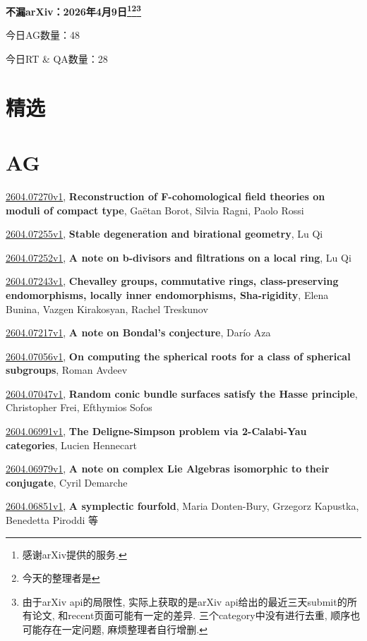 \documentclass[9pt, a4paper]{article}
\theoremstyle{plain}
\theoremstyle{definition}
\theoremstyle{remark}
\newcommand{\arxiv}[3]{\href{https://arxiv.org/abs/#1}{#1}, \textbf{\textcolor{arxivblue}{#2}}, #3}
\newcommand{\AGnumber}{48}
\newcommand{\RTQAnumber}{28}
\newcommand{\NewestDate}{2026年4月9日}
\newcommand{\todayarXiver}{} %
\begin{document}
\begin{center}
    \Huge\textbf{不漏arXiv：\NewestDate\footnote{感谢arXiv提供的服务.}\footnote{今天的整理者是\todayarXiver}\footnote{由于arXiv api的局限性, 实际上获取的是arXiv api给出的最近三天submit的所有论文, 和recent页面可能有一定的差异. 三个category中没有进行去重, 顺序也可能存在一定问题, 麻烦整理者自行增删.}} \\
\end{center}

\setcounter{section}{-1}

\begin{center}
    今日AG数量：\AGnumber
    
    今日RT \& QA数量：\RTQAnumber
    
\end{center}


\section{精选}


\section{AG}
\arxiv{2604.07270v1}{Reconstruction of F-cohomological field theories on moduli of compact type}{Gaëtan Borot, Silvia Ragni, Paolo Rossi}

\arxiv{2604.07255v1}{Stable degeneration and birational geometry}{Lu Qi}

\arxiv{2604.07252v1}{A note on b-divisors and filtrations on a local ring}{Lu Qi}

\arxiv{2604.07243v1}{Chevalley groups, commutative rings, class-preserving endomorphisms, locally inner endomorphisms, Sha-rigidity}{Elena Bunina, Vazgen Kirakosyan, Rachel Treskunov}

\arxiv{2604.07217v1}{A note on Bondal's conjecture}{Darío Aza}

\arxiv{2604.07056v1}{On computing the spherical roots for a class of spherical subgroups}{Roman Avdeev}

\arxiv{2604.07047v1}{Random conic bundle surfaces satisfy the Hasse principle}{Christopher Frei, Efthymios Sofos}

\arxiv{2604.06991v1}{The Deligne-Simpson problem via 2-Calabi-Yau categories}{Lucien Hennecart}

\arxiv{2604.06979v1}{A note on complex Lie Algebras isomorphic to their conjugate}{Cyril Demarche}

\arxiv{2604.06851v1}{A symplectic fourfold}{Maria Donten-Bury, Grzegorz Kapustka, Benedetta Piroddi 等}
\end{document}
